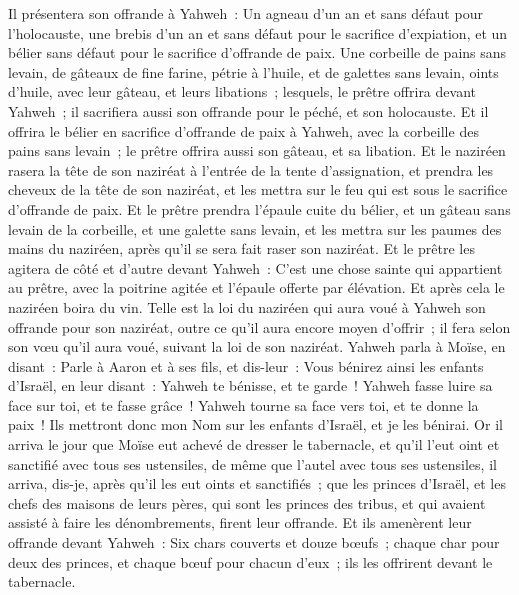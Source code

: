 \begin{multicols}{2}
Il présentera son offrande à Yahweh~: Un agneau d'un an et sans défaut pour l'holocauste, une brebis d'un an et sans défaut pour le sacrifice d'expiation, et un bélier sans défaut pour le sacrifice d'offrande de paix.
Une corbeille de pains sans levain, de gâteaux de fine farine, pétrie à l'huile, et de galettes sans levain, oints d'huile, avec leur gâteau, et leurs libations~;
lesquels, le prêtre offrira devant Yahweh~; il sacrifiera aussi son offrande pour le péché, et son holocauste.
Et il offrira le bélier en sacrifice d'offrande de paix à Yahweh, avec la corbeille des pains sans levain~; le prêtre offrira aussi son gâteau, et sa libation.
Et le naziréen rasera la tête de son naziréat à l'entrée de la tente d'assignation, et prendra les cheveux de la tête de son naziréat, et les mettra sur le feu qui est sous le sacrifice d'offrande de paix.
Et le prêtre prendra l'épaule cuite du bélier, et un gâteau sans levain de la corbeille, et une galette sans levain, et les mettra sur les paumes des mains du naziréen, après qu'il se sera fait raser son naziréat.
Et le prêtre les agitera de côté et d'autre devant Yahweh~: C'est une chose sainte qui appartient au prêtre, avec la poitrine agitée et l'épaule offerte par élévation. Et après cela le naziréen boira du vin.
Telle est la loi du naziréen qui aura voué à Yahweh son offrande pour son naziréat, outre ce qu'il aura encore moyen d'offrir~; il fera selon son vœu qu'il aura voué, suivant la loi de son naziréat.
Yahweh parla à Moïse, en disant~:
Parle à Aaron et à ses fils, et dis-leur~: Vous bénirez ainsi les enfants d'Israël, en leur disant~:
Yahweh te bénisse, et te garde~!
Yahweh fasse luire sa face sur toi, et te fasse grâce~!
Yahweh tourne sa face vers toi, et te donne la paix~!
Ils mettront donc mon Nom sur les enfants d'Israël, et je les bénirai.
\VerseOne{}Or il arriva le jour que Moïse eut achevé de dresser le tabernacle, et qu'il l'eut oint et sanctifié avec tous ses ustensiles, de même que l'autel avec tous ses ustensiles, il arriva, dis-je, après qu'il les eut oints et sanctifiés~;
que les princes d'Israël, et les chefs des maisons de leurs pères, qui sont les princes des tribus, et qui avaient assisté à faire les dénombrements, firent leur offrande.
Et ils amenèrent leur offrande devant Yahweh~: Six chars couverts et douze bœufs~; chaque char pour deux des princes, et chaque bœuf pour chacun d'eux~; ils les offrirent devant le tabernacle.

\end{multicols}
